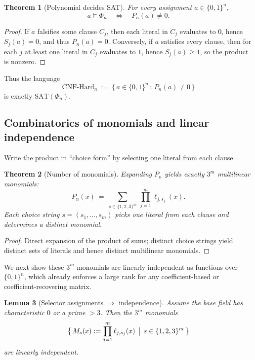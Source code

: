 \documentclass[12pt]{article}
\newtheorem{theorem}{Theorem}
\newtheorem{lemma}[theorem]{Lemma}
\theoremstyle{definition}
\theoremstyle{definition}
\theoremstyle{remark}
\theoremstyle{remark}
\begin{document}
\begin{theorem}[Polynomial decides SAT]\label{thm:poly-decides-sat}
For every assignment $a\in\{0,1\}^n$,
\[
a\models\Phi_n\quad\Longleftrightarrow\quad P_n(a)\neq 0.
\]
\end{theorem}

\begin{proof}
If $a$ falsifies some clause $C_j$, then each literal in $C_j$ evaluates to $0$, hence $S_j(a)=0$, and thus $P_n(a)=0$. Conversely, if $a$ satisfies every clause, then for each $j$ at least one literal in $C_j$ evaluates to $1$, hence $S_j(a)\ge1$, so the product is nonzero.
\end{proof}

Thus the language
\[
\mathrm{CNF}\text{-}\mathrm{Hard}_n\ :=\ \bigl\{\,a\in\{0,1\}^n\,:\,P_n(a)\neq 0\,\bigr\}
\]
is exactly $\mathrm{SAT}(\Phi_n)$.

\subsection{Combinatorics of monomials and linear independence}

Write the product in ``choice form'' by selecting one literal from each clause.

\begin{theorem}[Number of monomials]\label{thm:num-monomials}
Expanding $P_n$ yields exactly $3^m$ multilinear monomials:
\[
P_n(x)\ =\ \sum_{s\in\{1,2,3\}^m}\,\prod_{j=1}^m\ell_{j,s_j}(x).
\]
Each choice string $s=(s_1,\dots,s_m)$ picks one literal from each clause and determines a distinct monomial.
\end{theorem}

\begin{proof}
Direct expansion of the product of sums; distinct choice strings yield distinct sets of literals and hence distinct multilinear monomials.
\end{proof}

We next show these $3^m$ monomials are linearly independent as functions over $\{0,1\}^n$, which already enforces a large rank for any coefficient-based or coefficient-recovering matrix.

\begin{lemma}[Selector assignments $\Rightarrow$ independence]\label{lem:selector-independence}
Assume the base field has characteristic $0$ or a prime $>3$. Then the $3^m$ monomials
\[
\bigl\{\,M_s(x):=\prod_{j=1}^m\ell_{j,s_j}(x)\,\bigm|\,s\in\{1,2,3\}^m\,\bigr\}
\]
are linearly independent.
\end{lemma}
\end{document}
